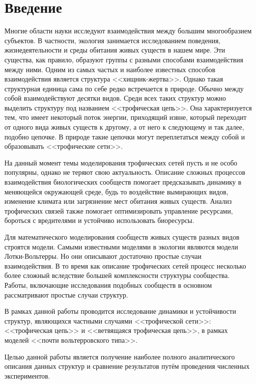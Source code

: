 \section{Введение}
Многие области науки исследуют взаимодействия между большим многообразием субъектов. В частности, экология занимается исследованием поведения, жизнедеятельности и среды обитания живых существ в нашем мире. Эти существа, как правило, образуют группы с разными способами взаимодействия между ними. Одним из самых частых и наиболее известных способов взаимодействия является структура <<хищник-жертва>>. Однако такая структурная единица сама по себе редко встречается в природе. Обычно между собой взаимодействуют десятки видов. Среди всех таких структур можно выделить структуру под названием <<трофическая цепь>>. Она характеризуется тем, что имеет некоторый поток энергии, приходящий извне, который переходит от одного вида живых существ к другому, а от него к следующему и так далее, подобно цепочке. В природе такие цепочки могут переплетаться между собой и образовывать <<трофические сети>>.

На данный момент темы моделирования трофических сетей пусть и не особо популярны, однако не теряют свою актуальность. Описание сложных процессов взаимодействия биологических сообществ помогает предсказывать динамику в меняющейся окружающей среде, будь то воздействие вымирающих видов, изменение климата или загрязнение мест обитания живых существ. Анализ трофических связей также помогает оптимизировать
управление ресурсами, бороться с вредителями и устойчиво использовать биоресурсы.

Для математического моделирования сообществ живых существ разных видов строятся модели. Самыми известными моделями в экологии являются модели Лотки-Вольтерры. Но они описывают достаточно простые случаи взаимодействия. В то время как описание трофических сетей процесс несколько более сложный вследствие большей комплексности структуры сообщества. Работы, включающие исследования подобных сообществ в основном рассматривают простые случаи структур.

В рамках данной работы проводится исследование динамики и устойчивости структур, являющихся частными случаями <<трофической сети>>: <<трофическая цепь>> и <<ветвящаяся трофическая цепь>>, в рамках моделей <<почти вольтерровского типа>>.

Целью данной работы является получение наиболее полного аналитического описания данных структур и сравнение результатов путём проведения численных экспериментов.
